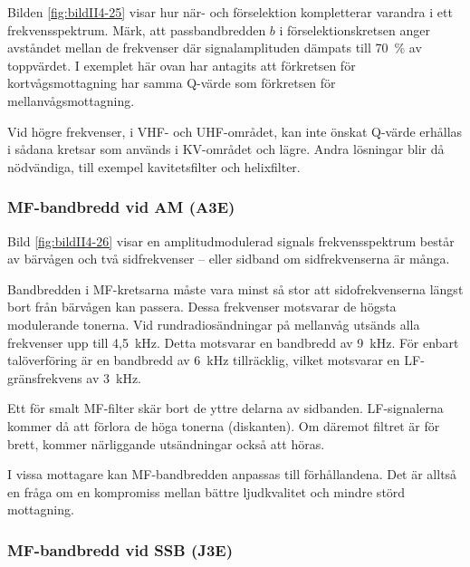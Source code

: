 
Bilden \ref{fig:bildII4-25} visar hur när- och förselektion kompletterar
varandra i ett frekvensspektrum.
Märk, att passbandbredden \(b\) i förselektionskretsen anger avståndet mellan
de frekvenser där signalamplituden dämpats till 70~\% av toppvärdet.
I exemplet här ovan har antagits att förkretsen för kortvågsmottagning har
samma Q-värde som förkretsen för mellanvågsmottagning.

Vid högre frekvenser, i VHF- och UHF-området, kan inte önskat Q-värde
erhållas i sådana kretsar som används i KV-området och lägre.
Andra lösningar blir då nödvändiga, till exempel kavitetsfilter och helixfilter.

\subsubsection{MF-bandbredd vid AM (A3E)}


Bild \ref{fig:bildII4-26} visar en amplitudmodulerad signals frekvensspektrum
består av bärvågen och två sidfrekvenser -- eller sidband om sidfrekvenserna
är många.

Bandbredden i MF-kretsarna måste vara minst så stor att sidofrekvenserna
längst bort från bärvågen kan passera.
Dessa frekvenser motsvarar de högsta modulerande tonerna.
Vid rundradiosändningar på mellanvåg utsänds alla frekvenser upp till 4,5~kHz.
Detta motsvarar en bandbredd av 9~kHz.
För enbart talöverföring är en bandbredd av 6~kHz tillräcklig, vilket
motsvarar en LF-gränsfrekvens av 3~kHz.

Ett för smalt MF-filter skär bort de yttre delarna av sidbanden.
LF-signalerna kommer då att förlora de höga tonerna (diskanten).
Om däremot filtret är för brett, kommer närliggande utsändningar också att
höras.

I vissa mottagare kan MF-bandbredden anpassas till förhållandena.
Det är alltså en fråga om en kompromiss mellan bättre ljudkvalitet och
mindre störd mottagning.

\subsubsection{MF-bandbredd vid SSB (J3E)}


